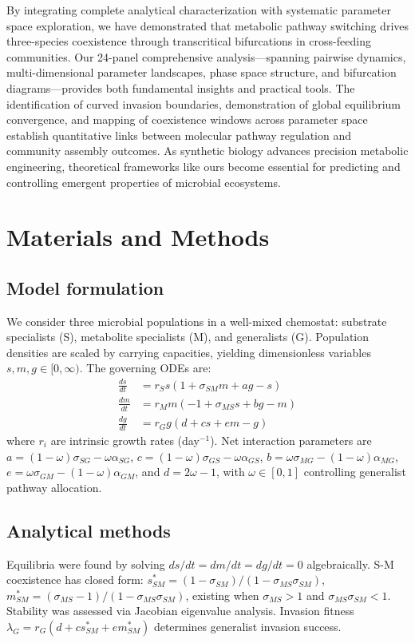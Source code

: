\documentclass[9pt,twocolumn,twoside]{pnas-new}
\begin{document}
By integrating complete analytical characterization with systematic parameter space exploration, we have demonstrated that metabolic pathway switching drives three-species coexistence through transcritical bifurcations in cross-feeding communities. Our 24-panel comprehensive analysis—spanning pairwise dynamics, multi-dimensional parameter landscapes, phase space structure, and bifurcation diagrams—provides both fundamental insights and practical tools. The identification of curved invasion boundaries, demonstration of global equilibrium convergence, and mapping of coexistence windows across parameter space establish quantitative links between molecular pathway regulation and community assembly outcomes. As synthetic biology advances precision metabolic engineering, theoretical frameworks like ours become essential for predicting and controlling emergent properties of microbial ecosystems.

\section*{Materials and Methods}

\subsection*{Model formulation}
We consider three microbial populations in a well-mixed chemostat: substrate specialists (S), metabolite specialists (M), and generalists (G). Population densities are scaled by carrying capacities, yielding dimensionless variables $s, m, g \in [0, \infty)$. The governing ODEs are:
\begin{align}
\frac{ds}{dt} &= r_S s(1 + \sigma_{SM} m + a g - s)\\
\frac{dm}{dt} &= r_M m(-1 + \sigma_{MS} s + b g - m)\\
\frac{dg}{dt} &= r_G g(d + c s + e m - g)
\end{align}
where $r_i$ are intrinsic growth rates (day$^{-1}$). Net interaction parameters are $a = (1-\omega)\sigma_{SG} - \omega\alpha_{SG}$, $c = (1-\omega)\sigma_{GS} - \omega\alpha_{GS}$, $b = \omega\sigma_{MG} - (1-\omega)\alpha_{MG}$, $e = \omega\sigma_{GM} - (1-\omega)\alpha_{GM}$, and $d = 2\omega - 1$, with $\omega \in [0,1]$ controlling generalist pathway allocation.

\subsection*{Analytical methods}
Equilibria were found by solving $ds/dt = dm/dt = dg/dt = 0$ algebraically. S-M coexistence has closed form: $s^*_{SM} = (1-\sigma_{SM})/(1-\sigma_{MS}\sigma_{SM})$, $m^*_{SM} = (\sigma_{MS}-1)/(1-\sigma_{MS}\sigma_{SM})$, existing when $\sigma_{MS} > 1$ and $\sigma_{MS}\sigma_{SM} < 1$. Stability was assessed via Jacobian eigenvalue analysis. Invasion fitness $\lambda_G = r_G(d + cs^*_{SM} + em^*_{SM})$ determines generalist invasion success.
\end{document}
